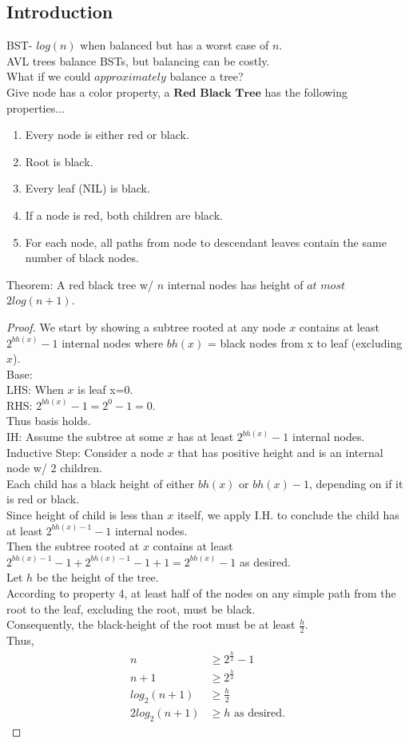 \documentclass{article}
\begin{document}
\subsection{Introduction}
BST- $log(n)$ when balanced but has a worst case of $n$.\\
AVL trees balance BSTs, but balancing can be costly.\\
What if we could $\textit{approximately}$ balance a tree?\\
Give node has a color property, a $\textbf{Red Black Tree}$ has the following \\ properties...
\begin{enumerate}
    \item Every node is either red or black.
    \item Root is black.
    \item Every leaf (NIL) is black.
    \item If a node is red, both children are black.
    \item For each node, all paths from node to descendant leaves contain the same number of black nodes.
\end{enumerate}
Theorem: A red black tree w/ $n$ internal nodes has height of $\textit{at most}$ $2log(n+1)$.
\begin{proof}
We start by showing a subtree rooted at any node $x$ contains at least $2^{bh(x)}-1$ internal nodes where $bh(x)$ = black nodes from x to leaf (excluding $x$).\\
Base:\\
LHS: When $x$ is leaf x=0.\\
RHS: $2^{bh(x)}-1 = 2^0 - 1 = 0$.\\
Thus basis holds.\\
IH: Assume the subtree at some $x$ has at least $2^{bh(x)}-1$ internal nodes.
Inductive Step: Consider a node $x$ that has positive height and is an internal node w/ 2 children.\\
Each child has a black height of either $bh(x)$ or $bh(x) - 1$, depending on if it is red or black.\\
Since height of child is less than $x$ itself, we apply I.H. to conclude the child has at least $2^{bh(x)-1}-1$ internal nodes.\\
Then the subtree rooted at $x$ contains at least $2^{bh(x)-1}-1+2^{bh(x)-1}-1+1 = 2^{bh(x)}-1$ as desired.\\
Let $h$ be the height of the tree.\\
According to property 4, at least half of the nodes on any simple path from the root to the leaf, excluding the root, must be black.\\
Consequently, the black-height of the root must be at least $\frac{h}{2}$.\\
Thus,\\
\begin{align*}
    n &\geq 2^{\frac{h}{2}}-1\\
    n+1 &\geq 2^{\frac{h}{2}}\\
    log_2(n+1) &\geq \frac{h}{2}\\
    2log_2(n+1) &\geq h \text{ as desired.}
\end{align*}
\end{proof}
\end{document}

